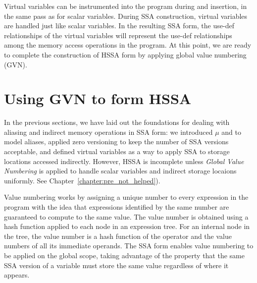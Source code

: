 Virtual variables can be instrumented into the program during 
\mufun and \chifun insertion, in the same pass as for scalar variables.
During SSA construction, virtual variables are handled just like scalar 
variables. In the resulting SSA form, the use-def relationships of the virtual 
variables will represent the use-def relationships among the memory access operations in the program.
At this point, we are ready to complete the construction of HSSA form by applying global value numbering (GVN).

\section{Using GVN to form HSSA}
\label{sec:hssa:GVN}
In the previous sections, we have laid out the foundations for dealing with aliasing and indirect memory operations in SSA form: we introduced $\mu$ and \chiops to model aliases, applied zero versioning to keep the number of SSA versions acceptable, and defined virtual variables as a way to apply SSA to storage locations accessed indirectly. However, HSSA is incomplete unless {\em Global Value Numbering} is applied to handle scalar variables and indirect storage locaions uniformly. See Chapter~\ref{chapter:pre_not_helped}).

Value numbering works by assigning a unique number to every expression in the program with the idea that expressions identified by the same number are guaranteed to compute to the same value.
The value number is obtained using a hash function applied to each node in an
expression tree.  For an internal node in the tree, the value number is a hash
function of the operator and the value numbers of all its immediate operands.
The SSA form enables value numbering to be applied on the global scope, taking 
advantage of the property that the same SSA version of a variable must store the same value regardless of where it appears.

